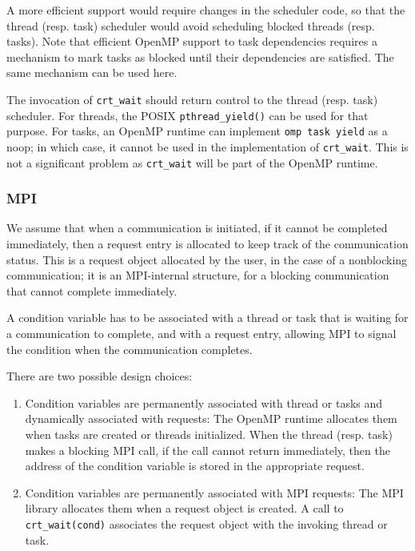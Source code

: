 A more efficient support would require changes in the scheduler code, 
so that the thread (resp. task) scheduler would avoid scheduling blocked 
threads (resp. tasks). Note that efficient OpenMP support to task dependencies 
requires a mechanism to mark tasks as blocked until their dependencies are 
satisfied. The same mechanism can be used here.

The invocation of \texttt{crt\_wait} should return control to the thread (resp. 
task) scheduler. For threads, the POSIX 
\texttt{pthread\_yield()} can be used for that purpose. For tasks, an OpenMP 
runtime can 
implement \texttt{omp task yield} as a noop; in which case, it cannot be used 
in the implementation of \texttt{crt\_wait}. This is not a significant problem 
as \texttt{crt\_wait} will be part of the OpenMP runtime.

\subsubsection{MPI}

We assume that when a communication is initiated, if it cannot be completed 
immediately, then a request entry is allocated to keep track of the 
communication 
status. This is a request object allocated by the user, in the case of a 
nonblocking communication; it is an MPI-internal structure, for a blocking 
communication that cannot complete immediately.

A condition variable has to be associated with a thread or task that is waiting 
for a communication to complete, and with a request entry, allowing MPI to 
signal the condition when the communication completes.

There are two possible design choices:
\begin{enumerate}
	\item 
	Condition variables are permanently associated with thread or tasks and 
	dynamically associated with requests: The OpenMP 
	runtime allocates them when tasks are created or threads initialized.
	When the thread (resp. task) makes a blocking MPI call, if the call cannot 
	return immediately, then the address of the condition variable is stored in 
	the appropriate request.
	\item 
	Condition variables are permanently associated with MPI requests: The MPI 
	library 
	allocates them when a request object is created. A call to 
	\texttt{crt\_wait(cond)} associates the request object with the invoking 
	thread or task.
\end{enumerate}

